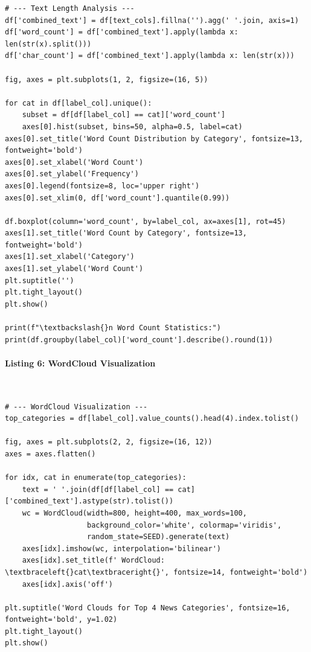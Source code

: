 \documentclass[12pt,a4paper,oneside]{report}
\begin{document}
\begin{Verbatim}[commandchars=\\\{\},breaklines=true,breakanywhere=true,fontsize=\scriptsize,frame=leftline,framesep=2mm,rulecolor=\color{gray}]
# --- Text Length Analysis ---
df['combined_text'] = df[text_cols].fillna('').agg(' '.join, axis=1)
df['word_count'] = df['combined_text'].apply(lambda x: len(str(x).split()))
df['char_count'] = df['combined_text'].apply(lambda x: len(str(x)))

fig, axes = plt.subplots(1, 2, figsize=(16, 5))

for cat in df[label_col].unique():
    subset = df[df[label_col] == cat]['word_count']
    axes[0].hist(subset, bins=50, alpha=0.5, label=cat)
axes[0].set_title('Word Count Distribution by Category', fontsize=13, fontweight='bold')
axes[0].set_xlabel('Word Count')
axes[0].set_ylabel('Frequency')
axes[0].legend(fontsize=8, loc='upper right')
axes[0].set_xlim(0, df['word_count'].quantile(0.99))

df.boxplot(column='word_count', by=label_col, ax=axes[1], rot=45)
axes[1].set_title('Word Count by Category', fontsize=13, fontweight='bold')
axes[1].set_xlabel('Category')
axes[1].set_ylabel('Word Count')
plt.suptitle('')
plt.tight_layout()
plt.show()

print(f"\textbackslash{}n Word Count Statistics:")
print(df.groupby(label_col)['word_count'].describe().round(1))
\end{Verbatim}
\paragraph{Listing 6: WordCloud Visualization}\mbox{}\\[-1ex]
\begin{Verbatim}[commandchars=\\\{\},breaklines=true,breakanywhere=true,fontsize=\scriptsize,frame=leftline,framesep=2mm,rulecolor=\color{gray}]
# --- WordCloud Visualization ---
top_categories = df[label_col].value_counts().head(4).index.tolist()

fig, axes = plt.subplots(2, 2, figsize=(16, 12))
axes = axes.flatten()

for idx, cat in enumerate(top_categories):
    text = ' '.join(df[df[label_col] == cat]['combined_text'].astype(str).tolist())
    wc = WordCloud(width=800, height=400, max_words=100,
                   background_color='white', colormap='viridis',
                   random_state=SEED).generate(text)
    axes[idx].imshow(wc, interpolation='bilinear')
    axes[idx].set_title(f' WordCloud: \textbraceleft{}cat\textbraceright{}', fontsize=14, fontweight='bold')
    axes[idx].axis('off')

plt.suptitle('Word Clouds for Top 4 News Categories', fontsize=16, fontweight='bold', y=1.02)
plt.tight_layout()
plt.show()
\end{Verbatim}
\end{document}
